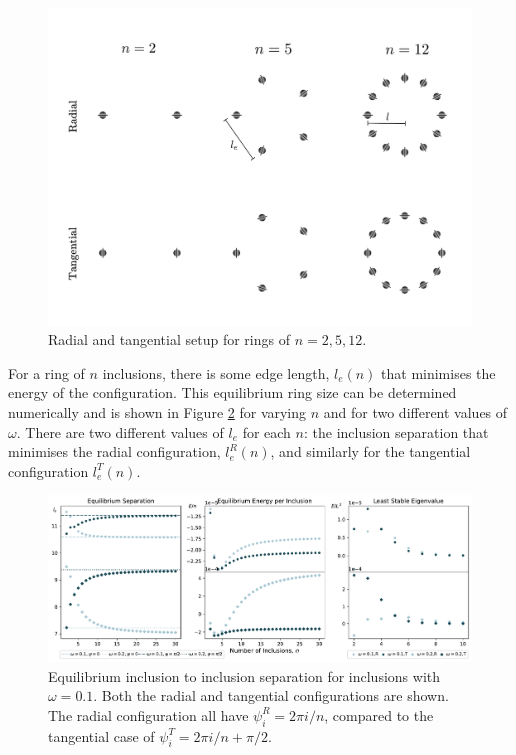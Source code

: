 \begin{figure}[h!]
\centering
\includegraphics[width=14cm]{figures/3-elastic-figs/n_rings.pdf}
\caption{Radial and tangential setup for rings of $n=2,5,12$.}
\label{fig:polys2ring}
\end{figure}

For a ring of $n$ inclusions, there is some edge length, $l_e(n)$ that minimises the energy of the configuration. This equilibrium ring size can be determined numerically and is shown in Figure \ref{fig:Efnl} for varying $n$ and for two different values of $\omega$. There are two different values of $l_e$ for each $n$: the inclusion separation that minimises the radial configuration, $l_e^R(n)$, and similarly for the tangential configuration $l_e^T(n)$.

\begin{figure}[h]
\centering
\includegraphics[width=15cm]{figures/3-elastic-figs/polys_multiple_w.pdf}
\caption{Equilibrium inclusion to inclusion separation for inclusions with $\omega=0.1$. Both the radial and tangential configurations are shown. The radial configuration all have $\psi^R_i=2\pi i/n$, compared to the tangential case of $\psi^T_i=2\pi i/n+\pi/2$. }
\label{fig:Efnl}
\end{figure}

